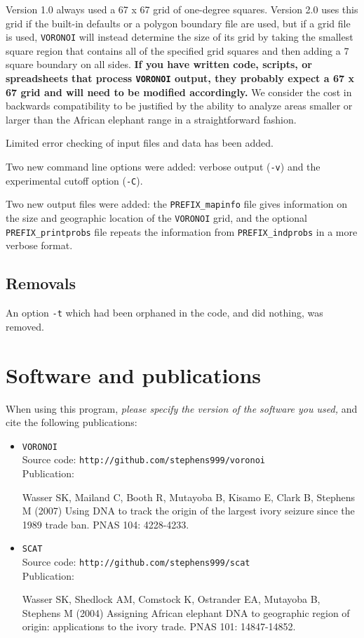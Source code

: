 \documentclass[10pt,titlepage,times,letterpaper]{article}
\def\SCAT{{\tt SCAT} }
\def\VORONOI{{\tt VORONOI} }
\begin{document}
Version 1.0 always used a 67 x 67 grid of one-degree squares.  Version 2.0 uses this
grid if the built-in defaults or a polygon boundary file are used, but if a grid file is used,
\VORONOI will instead determine the size of its grid by taking the smallest square region 
that contains all of the specified grid squares and then adding a 7 square boundary on all 
sides.  
{\bf If you have written code, scripts, or spreadsheets that process \VORONOI output, they
probably expect a 67 x 67 grid and will need to be modified accordingly.}  We consider
the cost in backwards compatibility to be justified by the ability to analyze areas 
smaller or larger than the African elephant range in a straightforward fashion.

Limited error checking of input files and data has been added.

Two new command line options were added:  verbose output ({\tt -v}) and the experimental cutoff 
option ({\tt -C}). 

Two new output files were added:  the {\tt PREFIX\_mapinfo} file gives information on the
size and geographic location of the \VORONOI grid, and the optional {\tt PREFIX\_printprobs}
file repeats the information from {\tt PREFIX\_indprobs} in a more verbose format.

\subsection{Removals}

An option {\tt -t} which had been orphaned in the code, and did nothing, was removed.

\section{Software and publications}\label{software}

When using this program, {\it please specify the version of the software you used,} and
cite the following publications:

\begin{itemize}
\item \VORONOI \\
Source code: {\tt http://github.com/stephens999/voronoi} \\
Publication:

Wasser SK, Mailand C, Booth R, Mutayoba B, Kisamo E, Clark B, Stephens M (2007)
Using DNA to track the origin of the largest ivory seizure since the 1989 trade ban.
PNAS 104: 4228-4233.

\item \SCAT \\ 
Source code:  {\tt http://github.com/stephens999/scat} \\
Publication:

Wasser SK, Shedlock AM, Comstock K, Ostrander EA, Mutayoba B, Stephens M (2004)
Assigning African elephant DNA to geographic region of origin:  applications
to the ivory trade.  PNAS 101: 14847-14852.
\end{itemize}
\end{document}
